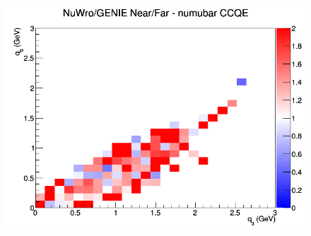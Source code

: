 \begin{figure}[h]
\endminipage
{}
\includegraphics[width=\linewidth]{eff_q0_q3/FGT/ratios/CCQE_NuWro_GENIE_numubar_NF_q3_q0.png}
\endminipage
\newline
\end{figure}
\clearpage
